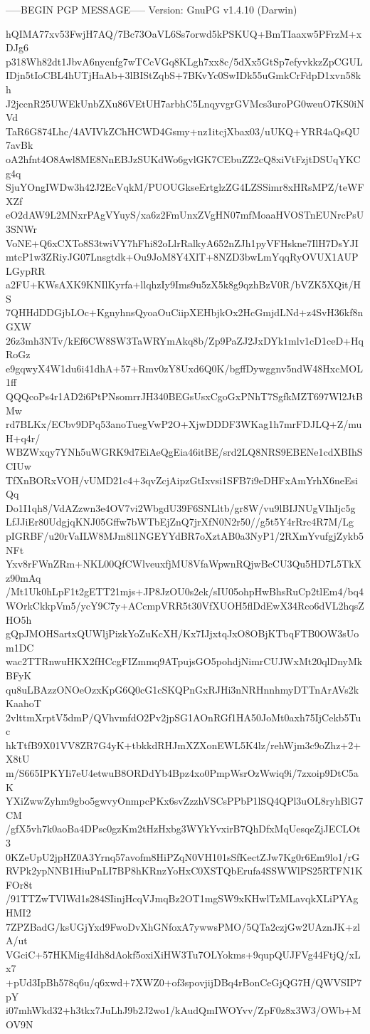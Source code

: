 -----BEGIN PGP MESSAGE-----
Version: GnuPG v1.4.10 (Darwin)

hQIMA77xv53FwjH7AQ/7Bc73OaVL6Ss7orwd5kPSKUQ+BmTIaaxw5PFrzM+xDJg6
p318Wh82dt1JbvA6nycnfg7wTCcVGq8KLgh7xx8c/5dXx5GtSp7efyvkkzZpCGUL
IDjn5tIoCBL4hUTjHaAb+3lBIStZqbS+7BKvYc0SwIDk55uGmkCrFdpD1xvn58kh
J2jccnR25UWEkUnbZXu86VEtUH7arbhC5LnqyvgrGVMcs3uroPG0weuO7KS0iNVd
TaR6G874Lhc/4AVIVkZChHCWD4Gsmy+nz1itcjXbax03/uUKQ+YRR4aQsQU7avBk
oA2hfnt4O8Awl8ME8NnEBJzSUKdWo6gvlGK7CEbuZZ2cQ8xiVtFzjtDSUqYKCg4q
SjuYOngIWDw3h42J2EcVqkM/PUOUGkseErtglzZG4LZSSimr8xHRsMPZ/teWFXZf
eO2dAW9L2MNxrPAgVYuyS/xa6z2FmUnxZVgHN07mfMoaaHVOSTnEUNrcPsU3SNWr
VoNE+Q6xCXTo8S3twiVY7hFhi82oLlrRalkyA652nZJh1pyVFHskne7IlH7DsYJI
mtcP1w3ZRiyJG07Lnsgtdk+Ou9JoM8Y4XlT+8NZD3bwLmYqqRyOVUX1AUPLGypRR
a2FU+KWsAXK9KNIlKyrfa+llqhzIy9Ims9u5zX5k8g9qzhBzV0R/bVZK5XQit/HS
7QHHdDDGjbLOc+KgnyhnsQyoaOuCiipXEHbjkOx2HcGmjdLNd+z4SvH36kf8nGXW
26z3mh3NTv/kEf6CW8SW3TaWRYmAkq8b/Zp9PaZJ2JxDYk1mlv1cD1ceD+HqRoGz
e9gqwyX4W1du6i41dhA+57+Rmv0zY8Uxd6Q0K/bgffDywggnv5ndW48HxcMOL1ff
QQQcoPs4r1AD2i6PtPNsomrrJH340BEGsUsxCgoGxPNhT7SgfkMZT697Wl2JtBMw
rd7BLKx/ECbv9DPq53anoTuegVwP2O+XjwDDDF3WKag1h7mrFDJLQ+Z/muH+q4r/
WBZWxqy7YNh5uWGRK9d7EiAeQgEia46itBE/srd2LQ8NRS9EBENe1cdXBIhSCIUw
TfXnBORxVOH/vUMD21c4+3qvZcjAipzGtIxvsi1SFB7i9eDHFxAmYrhX6neEsiQq
Do1I1qh8/VdAZzwn3e4OV7vi2WbgdU39F6SNLltb/gr8W/vu9lBIJNUgVIhIjc5g
LfJJiEr80UdgjqKNJ05Gffw7bWTbEjZnQ7jrXfN0N2r50//g5t5Y4rRrc4R7M/Lg
pIGRBF/u20rVaILW8MJm8l1NGEYYdBR7oXztAB0a3NyP1/2RXmYvufgjZykb5NFt
Yxv8rFWnZRm+NKL00QfCWlveuxfjMU8VfaWpwnRQjwBcCU3Qu5HD7L5TkXz90mAq
/Mt1Uk0hLpF1t2gETT21mjs+JP8JzOU0s2ek/sIU05ohpHwBhsRuCp2tlEm4/bq4
WOrkCkkpVm5/ycY9C7y+ACcmpVRR5t30VfXUOH5flDdEwX34Rco6dVL2hqsZHO5h
gQpJMOHSartxQUWljPizkYoZuKcXH/Kx7IJjxtqJxO8OBjKTbqFTB0OW3sUom1DC
wac2TTRnwuHKX2fHCcgFIZmmq9ATpujsGO5pohdjNimrCUJWxMt20qlDnyMkBFyK
qu8uLBAzzONOeOzxKpG6Q0cG1cSKQPnGxRJHi3nNRHnnhmyDTTnArAVs2kKaahoT
2vlttmXrptV5dmP/QVhvmfdO2Pv2jpSG1AOnRGf1HA50JoMt0axh75IjCekb5Tuc
hkTtfB9X01VV8ZR7G4yK+tbkkdRHJmXZXonEWL5K4lz/rehWjm3c9oZhz+2+X8tU
m/S665IPKYIi7eU4etwuB8ORDdYb4Bpz4xo0PmpWsrOzWwiq9i/7zxoip9DtC5aK
YXiZwwZyhm9gbo5gwvyOnmpcPKx6svZzzhVSCsPPbP1lSQ4QPl3uOL8ryhBlG7CM
/gfX5vh7k0aoBa4DPsc0gzKm2tHzHxbg3WYkYvxirB7QhDfxMqUesqeZjJECLOt3
0KZeUpU2jpHZ0A3Yrnq57avofm8HiPZqN0VH101sSfKectZJw7Kg0r6Em9lo1/rG
RVPk2ypNNB1HiuPnLI7BP8hKRnzYoHxC0XSTQbErufa4SSWWlPS25RTFN1KFOr8t
/91TTZwTVlWd1s284SIinjHcqVJmqBz2OT1mgSW9xKHwlTzMLavqkXLiPYAgHMI2
7ZPZBadG/ksUGjYxd9FwoDvXhGNfoxA7ywwsPMO/5QTa2czjGw2UAznJK+zlA/ut
VGciC+57HKMig4Idh8dAokf5oxiXiHW3Tu7OLYokms+9qupQUJFVg44FtjQ/xLx7
+pUd3IpBh578q6u/q6xwd+7XWZ0+of3spovjijDBq4rBonCeGjQG7H/QWVSIP7pY
i07mhWkd32+h3tkx7JuLhJ9b2J2wo1/kAudQmIWOYvv/ZpF0z8x3W3/OWb+MOV9N
